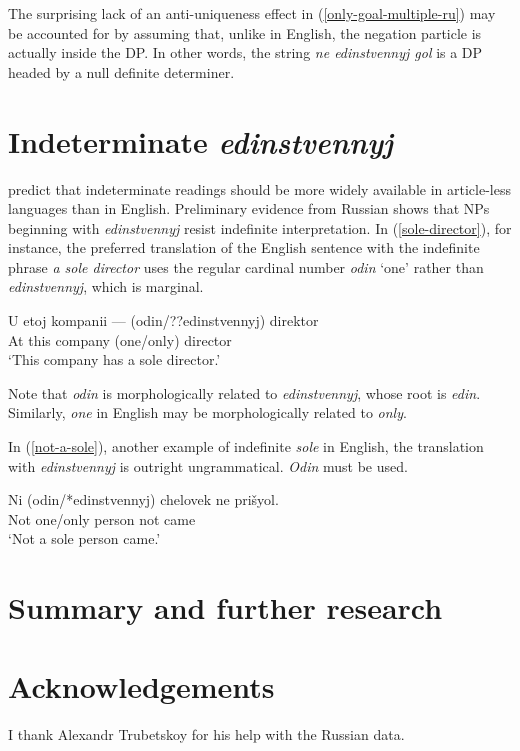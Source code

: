 \documentclass{article}
\begin{document}
The surprising lack of an anti-uniqueness effect in (\ref{only-goal-multiple-ru}) may be accounted for by assuming that, unlike in English, the negation particle is actually inside the DP. In other words, the string \textit{ne edinstvennyj gol} is a DP headed by a null definite determiner.

\section{Indeterminate \textit{edinstvennyj}}
\citet{cb2015} predict that indeterminate readings should be more widely available in article-less languages than in English. Preliminary evidence from Russian shows that NPs beginning with \textit{edinstvennyj} resist indefinite interpretation. In (\ref{sole-director}), for instance, the preferred translation of the English sentence with the indefinite phrase \textit{a sole director} uses the regular cardinal number \textit{odin} `one' rather than \textit{edinstvennyj}, which is marginal.

\begin{exe}
	\ex \label{sole-director} \gll U etoj kompanii --- (odin/??edinstvennyj) direktor\\
	At this company {} (one/only) director\\
	\glt `This company has a sole director.'
\end{exe}

Note that \textit{odin} is morphologically related to \textit{edinstvennyj}, whose root is \textit{edin}. Similarly, \textit{one} in English may be morphologically related to \textit{only}.

In (\ref{not-a-sole}), another example of indefinite \textit{sole} in English, the translation with \textit{edinstvennyj} is outright ungrammatical. \textit{Odin} must be used.

\begin{exe}
	\ex \label{not-a-sole} \gll Ni (odin/*edinstvennyj) chelovek ne pri\v{s}yol.\\
	Not one/only person not came\\
	\glt `Not a sole person came.'
\end{exe}


\section{Summary and further research}

\section*{Acknowledgements}
I thank Alexandr Trubetskoy for his help with the Russian data.



\end{document}
